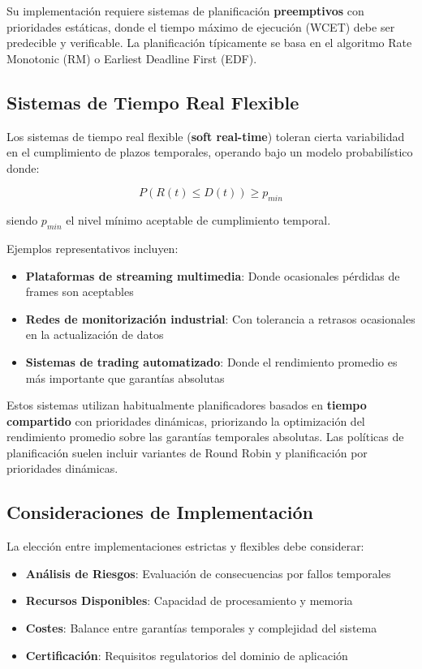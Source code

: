     Su implementación requiere sistemas de planificación \textbf{preemptivos} con prioridades estáticas, donde el tiempo máximo de ejecución (WCET) debe ser predecible y verificable. La planificación típicamente se basa en el algoritmo Rate Monotonic (RM) o Earliest Deadline First (EDF).

    \newpage
    \subsection{Sistemas de Tiempo Real Flexible}
    Los sistemas de tiempo real flexible (\textbf{soft real-time}) toleran cierta variabilidad en el cumplimiento de plazos temporales, operando bajo un modelo probabilístico donde:

    \begin{equation}
    P(R(t) \leq D(t)) \geq p_{min}
    \end{equation}

    siendo $p_{min}$ el nivel mínimo aceptable de cumplimiento temporal.

    Ejemplos representativos incluyen:
    \begin{itemize}
        \item \textbf{Plataformas de streaming multimedia}: Donde ocasionales pérdidas de frames son aceptables
        \item \textbf{Redes de monitorización industrial}: Con tolerancia a retrasos ocasionales en la actualización de datos
        \item \textbf{Sistemas de trading automatizado}: Donde el rendimiento promedio es más importante que garantías absolutas
    \end{itemize}

    Estos sistemas utilizan habitualmente planificadores basados en \textbf{tiempo compartido} con prioridades dinámicas, priorizando la optimización del rendimiento promedio sobre las garantías temporales absolutas. Las políticas de planificación suelen incluir variantes de Round Robin y planificación por prioridades dinámicas.

    \subsection{Consideraciones de Implementación}
    La elección entre implementaciones estrictas y flexibles debe considerar:
    \begin{itemize}
        \item \textbf{Análisis de Riesgos}: Evaluación de consecuencias por fallos temporales
        \item \textbf{Recursos Disponibles}: Capacidad de procesamiento y memoria
        \item \textbf{Costes}: Balance entre garantías temporales y complejidad del sistema
        \item \textbf{Certificación}: Requisitos regulatorios del dominio de aplicación
    \end{itemize}

